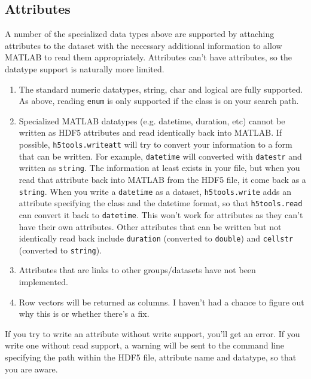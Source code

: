 \documentclass[11pt]{exam}
\newcommand\myfcn[1]{\colorbox{codegray}{\textcolor{codeblue}{\texttt{#1}}}}
\newcommand\matfcn[1]{\textcolor{darkteal}{\texttt{#1}}}
\begin{document}
		\subsection{Attributes}
		\noindent A number of the specialized data types above are supported by attaching attributes to the dataset with the necessary additional information to allow MATLAB to read them appropriately. Attributes can't have attributes, so the datatype support is naturally more limited. 
		\begin{enumerate}
			\item The standard numeric datatypes, string, char and logical are fully supported. As above, reading \texttt{enum} is only supported if the class is on your search path.
			\item Specialized MATLAB datatypes (e.g. datetime, duration, etc) cannot be written as HDF5 attributes and read identically back into MATLAB. If possible, \myfcn{h5tools.writeatt} will try to convert your information to a form that can be written. For example, \texttt{datetime} will converted with \matfcn{datestr} and written as \texttt{string}. The information at least exists in your file, but when you read that attribute back into MATLAB from the HDF5 file, it come back as a \texttt{string}. When you write a \texttt{datetime} as a dataset, \myfcn{h5tools.write} adds an attribute specifying the class and the datetime format, so that \myfcn{h5tools.read} can convert it back to \texttt{datetime}. This won't work for attributes as they can't have their own attributes. 
			Other attributes that can be written but not identically read back include \texttt{duration} (converted to \texttt{double}) and \texttt{cellstr} (converted to \texttt{string}).
			\item Attributes that are links to other groups/datasets have not been implemented. 
			\item Row vectors will be returned as columns. I haven't had a chance to figure out why this is or whether there's a fix.
		\end{enumerate}

		If you try to write an attribute without write support, you'll get an error. If you write one without read support, a warning will be sent to the command line specifying the path within the HDF5 file, attribute name and datatype, so that you are aware. 
\end{document}
